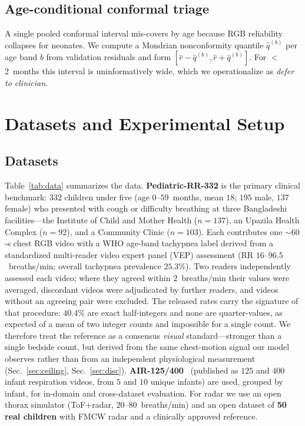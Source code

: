 \documentclass[journal]{IEEEtran}
\begin{document}
\subsection{Age-conditional conformal triage}
A single pooled conformal interval mis-covers by age because RGB reliability collapses for neonates.
We compute a Mondrian nonconformity quantile $\hat q^{(b)}$ per age band $b$ from validation residuals
and form $[\hat r - \hat q^{(b)}, \hat r + \hat q^{(b)}]$. For $<$2~months this interval is
uninformatively wide, which we operationalize as \emph{defer to clinician}.

\section{Datasets and Experimental Setup}
\subsection{Datasets}
Table~\ref{tab:data} summarizes the data. \textbf{Pediatric-RR-332} is the primary clinical benchmark:
$332$ children under five (age $0$--$59$~months, mean $18$; $195$ male, $137$ female) who presented with
cough or difficulty breathing at three Bangladeshi facilities---the Institute of Child and Mother Health
($n{=}137$), an Upazila Health Complex ($n{=}92$), and a Community Clinic ($n{=}103$). Each contributes one
$\sim$$60$-s chest RGB video with a WHO age-band tachypnea label derived from a standardized
multi-reader video expert panel (VEP) assessment (RR $16$--$96.5$~breaths/min; overall tachypnea
prevalence $25.3\%$). Two readers independently assessed each video; where they agreed within
$2$~breaths/min their values were averaged, discordant videos were adjudicated by further readers, and
videos without an agreeing pair were excluded. The released rates carry the signature of that
procedure: $40.4\%$ are exact half-integers and none are quarter-values, as expected of a mean of two
integer counts and impossible for a single count. We therefore treat the reference as a
consensus \emph{visual} standard---stronger than a single bedside count, but derived from the same
chest-motion signal our model observes rather than from an independent physiological measurement
(Sec.~\ref{sec:ceiling}, Sec.~\ref{sec:disc}). \textbf{AIR-125/400}~\cite{infant_air} (published as $125$ and $400$ infant
respiration videos, from $5$ and $10$ unique infants) are used, grouped by infant, for in-domain and
cross-dataset evaluation. For radar we use an open thorax
simulator (ToF$+$radar, $20$--$80$~breaths/min) and an open dataset of \textbf{50 real children} with
FMCW radar and a clinically approved reference.
\end{document}
